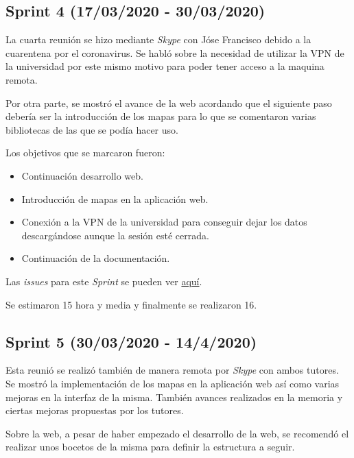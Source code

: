 
\subsection{Sprint 4 (17/03/2020 - 30/03/2020)}\label{Sprint-4}

La cuarta reunión se hizo mediante \emph{Skype} con Jóse Francisco debido a la cuarentena por el coronavirus. Se habló sobre la necesidad de utilizar la VPN de la universidad por este mismo motivo para poder tener acceso a la maquina remota. 

Por otra parte, se mostró el avance de la web acordando que el siguiente paso debería ser la introducción de los mapas para lo que se comentaron varias bibliotecas de las que se podía hacer uso.

Los objetivos que se marcaron fueron:
\begin{itemize}
	\item Continuación desarrollo web.
	\item Introducción de mapas en la aplicación web.
	\item Conexión a la VPN de la universidad para conseguir dejar los datos descargándose aunque la sesión esté cerrada.
	\item Continuación de la documentación.
\end{itemize}

Las \emph{issues} para este \emph{Sprint} se pueden ver \href{https://github.com/psnti/TFG-Pablo-Santidrian-Tudanca/milestone/4}{aquí}.


Se estimaron 15 hora y media y finalmente se realizaron 16.

\subsection{Sprint 5 (30/03/2020 - 14/4/2020)}\label{Sprint-5}

Esta reunió se realizó también de manera remota por \emph{Skype} con ambos tutores. Se mostró la implementación de los mapas en la aplicación web así como varias mejoras en la interfaz de la misma. También avances realizados en la memoria y ciertas mejoras propuestas por los tutores.

Sobre la web, a pesar de haber empezado el desarrollo de la web, se recomendó el realizar unos bocetos de la misma para definir la estructura a seguir.

